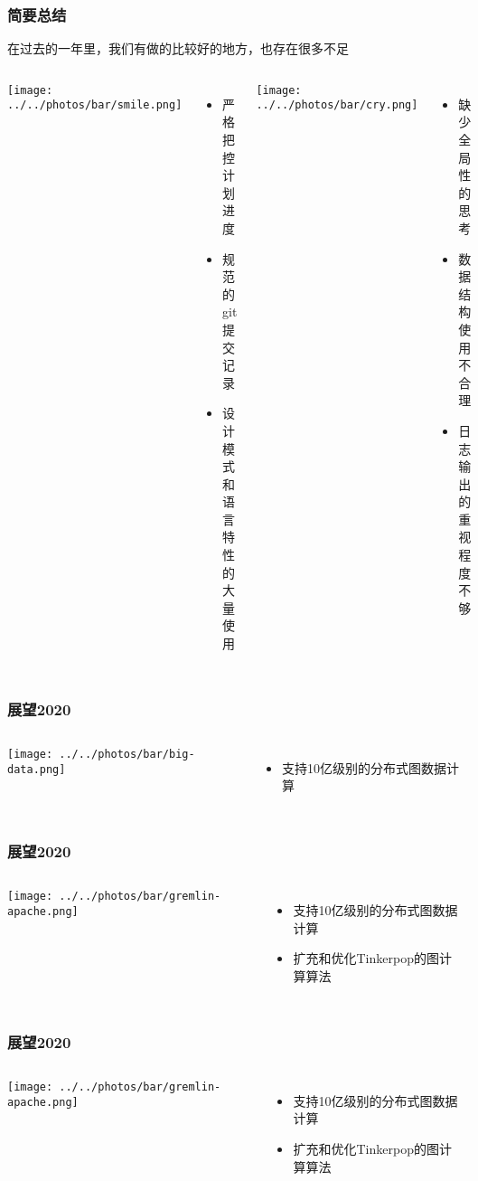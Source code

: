 \documentclass{beamer}
\begin{document}
  \begin{frame}
    \frametitle{简要总结}
    在过去的一年里，我们有做的比较好的地方，也存在很多不足

    \begin{columns}
        \texttt{[image: ../../photos/bar/smile.png]}
        \begin{itemize}
          \item 严格把控计划进度
          \item 规范的git提交记录
          \item 设计模式和语言特性的大量使用
        \end{itemize}
        \texttt{[image: ../../photos/bar/cry.png]}
        \begin{itemize}
          \item 缺少全局性的思考
          \item 数据结构使用不合理
          \item 日志输出的重视程度不够
        \end{itemize}
    \end{columns}
  \end{frame}

  \begin{frame}
  \frametitle{展望2020}
    \begin{columns}
        \texttt{[image: ../../photos/bar/big-data.png]}
      \begin{itemize}
        \item 支持10亿级别的分布式图数据计算
      \end{itemize}
    \end{columns}
  \end{frame}

  \begin{frame}
  \frametitle{展望2020}
    \begin{columns}
        \texttt{[image: ../../photos/bar/gremlin-apache.png]}
      \begin{itemize}
        \item 支持10亿级别的分布式图数据计算
        \item 扩充和优化Tinkerpop的图计算算法
      \end{itemize}
    \end{columns}
  \end{frame}

  \begin{frame}
  \frametitle{展望2020}
    \begin{columns}
        \texttt{[image: ../../photos/bar/gremlin-apache.png]}
      \begin{itemize}
        \item 支持10亿级别的分布式图数据计算
        \item 扩充和优化Tinkerpop的图计算算法
      \end{itemize}
    \end{columns}
  \end{frame}
\end{document}
